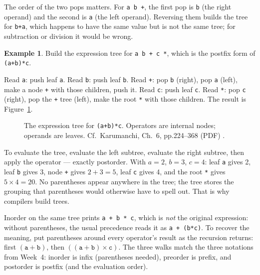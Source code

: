 \documentclass[11pt]{article}
\theoremstyle{definition}
\newtheorem{example}{Example}[section]
\begin{document}
The order of the two pops matters. For \texttt{a b +}, the first pop is
\texttt{b} (the right operand) and the second is \texttt{a} (the left
operand). Reversing them builds the tree for \texttt{b+a}, which happens to
have the same value but is not the same tree; for subtraction or division it
would be wrong.

\begin{example}
Build the expression tree for \texttt{a b + c *}, which is the postfix form
of \texttt{(a+b)*c}.

Read \texttt{a}: push leaf \texttt{a}. Read \texttt{b}: push leaf
\texttt{b}. Read \texttt{+}: pop \texttt{b} (right), pop \texttt{a} (left),
make a node \texttt{+} with those children, push it. Read \texttt{c}: push
leaf \texttt{c}. Read \texttt{*}: pop \texttt{c} (right), pop the
\texttt{+} tree (left), make the root \texttt{*} with those children. The
result is Figure~\ref{fig:expr}.
\end{example}

\begin{figure}[h]
  \centering
  \caption{The expression tree for \texttt{(a+b)*c}. Operators are internal
    nodes; operands are leaves. Cf.\ Karumanchi, Ch.~6, pp.224--368 (PDF)
    \cite{Karumanchi2017_data_structures_algorithms_made_easy}.}
  \label{fig:expr}
\end{figure}

To evaluate the tree, evaluate the left subtree, evaluate the right subtree,
then apply the operator --- exactly postorder. With $a=2$, $b=3$, $c=4$: leaf
\texttt{a} gives 2, leaf \texttt{b} gives 3, node \texttt{+} gives $2+3=5$,
leaf \texttt{c} gives 4, and the root \texttt{*} gives $5\times 4=20$. No
parentheses appear anywhere in the tree; the tree stores the grouping that
parentheses would otherwise have to spell out. That is why compilers build
trees.

Inorder on the same tree prints \texttt{a + b * c}, which is \emph{not} the
original expression: without parentheses, the usual precedence reads it as
\texttt{a + (b*c)}. To recover the meaning, put parentheses around every
operator's result as the recursion returns: first $(\texttt{a}+\texttt{b})$,
then $((\texttt{a}+\texttt{b})\times\texttt{c})$. The three walks match the
three notations from Week~4: inorder is infix (parentheses needed), preorder
is prefix, and postorder is postfix (and the evaluation order).
\end{document}
